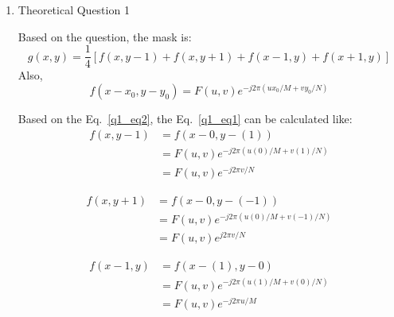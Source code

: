 \documentclass[12pt]{article}
\begin{document}
\begin{enumerate}[leftmargin=\labelsep]
\item Theoretical Question 1

    
    Based on the question, the mask is:
        \begin{equation}
            g(x, y) = \frac{1}{4}[f(x, y-1) + f(x, y+1) +f(x-1, y) +f(x+1, y)]  
            \label{q1_eq1}    
        \end{equation}
        Also, 
        \begin{equation}
            f(x - x_{0}, y - y_{0}) = F(u, v)e^{-j2 \pi (ux_{0}/M + vy_{0}/N)}
            \label{q1_eq2}
        \end{equation}

        Based on the Eq.~\ref{q1_eq2}, the Eq.~\ref{q1_eq1} can be calculated like:
        \begin{equation}
            \begin{aligned}
                f(x, y-1)
                &= f(x - 0, y -(1))\\
                &= F(u, v)e^{-j2\pi(u(0)/M + v(1)/N)}\\
                &= F(u, v)e^{-j2\pi v/N}
                \label{q1_eq3}
            \end{aligned}
        \end{equation}
        
        \begin{equation}
            \begin{aligned}
                f(x, y+1) 
                &= f(x-0, y-(-1))\\
                &= F(u, v)e^{-j2\pi (u(0)/M + v(-1)/N)}\\
                &= F(u, v)e^{j2\pi v/N}
            \label{q1_eq3}
            \end{aligned}
        \end{equation}

        \begin{equation}
            \begin{aligned}
                f(x-1, y) 
                &= f(x-(1), y-0)\\
                &= F(u, v)e^{-j2\pi(u(1)/M + v(0)/N)}\\
                &= F(u, v)e^{-j2\pi u/M}
            \label{q1_eq4}
            \end{aligned}
        \end{equation}


\end{enumerate}
\end{document}
